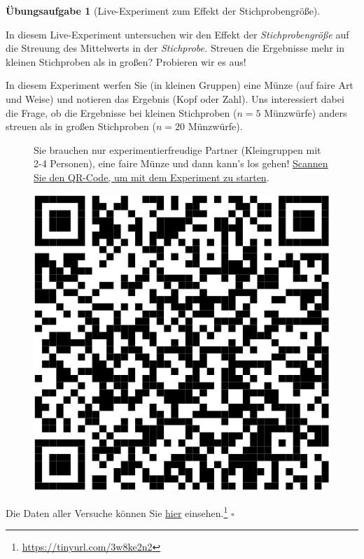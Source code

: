\documentclass[
  letterpaper,
  twoside,
  open=any]{scrbook}
\theoremstyle{definition}
\theoremstyle{definition}
\newtheorem{exercise}{Übungsaufgabe}[chapter]
\theoremstyle{definition}
\theoremstyle{remark}
\begin{document}
\begin{exercise}[Live-Experiment zum Effekt der
Stichprobengröße]\protect\hypertarget{exr-kleine-grosse-stipro}{}\label{exr-kleine-grosse-stipro}

In diesem Live-Experiment untersuchen wir den Effekt der
\emph{Stichprobengröße} auf die Streuung des Mittelwerts in der
\emph{Stichprobe.} Streuen die Ergebnisse mehr in kleinen Stichproben
als in großen? Probieren wir es aus!

In diesem Experiment werfen Sie (in kleinen Gruppen) eine Münze (auf
faire Art und Weise) und notieren das Ergebnis (Kopf oder Zahl). Uns
interessiert dabei die Frage, ob die Ergebnisse bei kleinen Stichproben
(\(n=5\) Münzwürfe) anders streuen als in großen Stichproben (\(n=20\)
Münzwürfe).

\begin{figure}

\begin{minipage}{0.80\linewidth}
Sie brauchen nur experimentierfreudige Partner (Kleingruppen mit 2-4
Personen), eine faire Münze und dann kann's los gehen!
\href{https://docs.google.com/forms/d/e/1FAIpQLSeAwqNyZtyQwttq5JrQdQ2AO7w5vzcVDXjiejKnyFNxiWtEag/viewform?usp=sf_link}{Scannen
Sie den QR-Code, um mit dem Experiment zu starten}.\end{minipage}%
%
\begin{minipage}{0.20\linewidth}

\begin{center}
\includegraphics[width=0.75\linewidth,height=\textheight,keepaspectratio]{010-rahmen_files/figure-pdf/unnamed-chunk-17-1.pdf}
\end{center}

\end{minipage}%

\end{figure}%

Die Daten aller Versuche können Sie
\href{https://docs.google.com/spreadsheets/d/11mKFFpr-Y1CMPpq4dGA-JA_Z9jRkPbXolo54Y0G_2gE/edit?usp=sharing}{hier}
einsehen.\footnote{\url{https://tinyurl.com/3w8ke2n2}} \(\square\)

\end{exercise}
\end{document}
